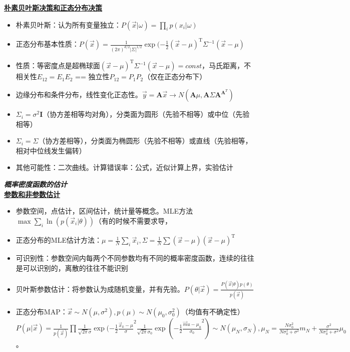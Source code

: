\documentclass[UTF8,a4paper,landscape,compress]{paper}
\renewcommand{\subsection}[1]{{\small\textbf{\underline{#1}}}\\ }
\renewcommand{\section}[1]{{\normalsize\textbf{\emph{#1}}}\\ }
\newcommand{\List}[1]{\begin{itemize}[fullwidth,itemindent=0em] #1 \end{itemize}}
\begin{document}
\begin{multicols}{4}
\subsection{朴素贝叶斯决策和正态分布决策}
\List{
    \item {朴素贝叶斯：认为所有变量独立：$P(\vec x|\omega) = \prod_i p(x_i|\omega)$}
    \item {正态分布基本性质：$P(\vec x) = \frac1{(2\pi)^{d/2}|\Sigma|^{1/2}}\exp(-\frac12(\vec x-\mu)^{\mathrm T}\Sigma^{-1}(\vec x-\mu)$}
    \item {性质：等密度点是超椭球面$(\vec x-\mu)^{\mathrm T}\Sigma^{-1}(\vec x-\mu) = const$，马氏距离，不相关性$E_{12} = E_1E_2$ == 独立性$P_{12} = P_1 P_2$（仅在正态分布下）}
    \item {边缘分布和条件分布，线性变化正态性。$\vec y = \mathbf A \vec x \rightarrow N(\mathbf A\mu,\mathbf A\Sigma\mathbf A^{\mathbf A^T})$}
    \item {$\Sigma_i = \sigma^2\mathbf I$（协方差相等均对角），分类面为圆形（先验不相等）或中位（先验相等）}
    \item {$\Sigma_i = \Sigma$（协方差相等），分类面为椭圆形（先验不相等）或直线（先验相等，相对中位线发生偏转）}
    \item {其他可能性：二次曲线。计算错误率：公式，近似计算上界，实验估计}
}
\section{概率密度函数的估计}
\subsection{参数和非参数估计}
\List{
    \item {参数空间，点估计，区间估计，统计量等概念。MLE方法$\max \sum_i \ln(p(\vec x_i|\theta))$（有的时候不需要求导，}
    \item {正态分布的MLE估计方法：$\mu = \frac1N\sum_i\vec x_i, \Sigma = \frac1N\sum(\vec x - \mu)(\vec x - \mu)^{\mathrm T}$}
    \item {可识别性：参数空间内每两个不同参数均有不同的概率密度函数，连续的往往是可以识别的，离散的往往不能识别}
    \item {贝叶斯参数估计：将参数认为成随机变量，并有先验。$P(\theta|\vec x) = \frac{P(\vec x | \theta)p(\theta)}{p(\vec x)}$}
    \item {正态分布MAP：$\vec x \sim N(\mu,\sigma^2), p(\mu) \sim N(\mu_0,\sigma_0^2)$（均值有不确定性）$P(\mu|\vec x) = \frac1{p(\vec x)}\prod \frac1{\sqrt{2\pi}\sigma}\exp(-\frac12\frac{\vec x_k - \mu}{\sigma}^2\frac1{\sqrt{2\pi}\sigma_0}\exp(-\frac12\frac{\vec mu - \mu_0}{\sigma_0}^2) \sim N(\mu_N,\sigma_N),\mu_N = \frac{N\sigma_0^2}{N\sigma_0^2+\sigma^2}m_N + \frac{\sigma^2}{N\sigma_0^2+\sigma^2}\mu_0$。
    
}}
\end{multicols}
\end{document}
